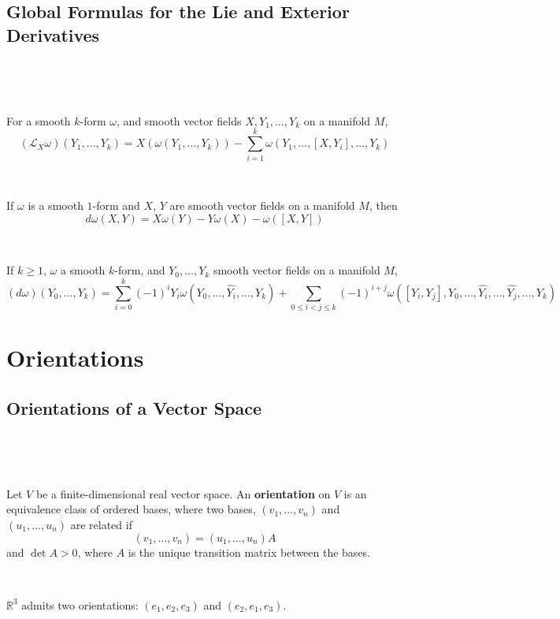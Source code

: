 \documentclass{article}
\begin{document}
\subsection{Global Formulas for the Lie and Exterior Derivatives}
\

\begin{theorem}
  \

  For a smooth $k$-form $\omega$, and smooth vector fields $X, Y_1, \dots, Y_k$ on a manifold $M$, $$(\mathcal{L}_X\omega)(Y_1,\dots,Y_k) = X(\omega(Y_1,\dots,Y_k)) - \sum_{i=1}^k\omega(Y_1, \dots, [X, Y_i], \dots, Y_k)$$
\end{theorem}

\begin{proposition}
  \

  If $\omega$ is a smooth $1$-form and $X$, $Y$ are smooth vector fields on a manifold $M$, then $$d\omega(X,Y) = X\omega(Y) - Y\omega(X) - \omega([X,Y])$$
\end{proposition}

\begin{theorem}
  \

  If $k\geq 1$, $\omega$ a smooth $k$-form, and $Y_0,\dots, Y_k$ smooth vector fields on a manifold $M$, $$(d\omega)(Y_0, \dots, Y_k) = \sum_{i=0}^k(-1)^iY_i\omega(Y_0, \dots, \hat{Y_i}, \dots, Y_k) + \sum_{0 \leq i < j \leq k} (-1)^{i+j} \omega([Y_i, Y_j], Y_0, \dots, \hat{Y_i}, \dots, \hat{Y_j}, \dots, Y_k)$$
\end{theorem}

\section{Orientations}

\subsection{Orientations of a Vector Space}
\

\begin{definition}[Orientations]
  \

  Let $V$ be a finite-dimensional real vector space. An \textbf{orientation} on $V$ is an equivalence class of ordered bases, where two bases, $(v_1, \dots, v_n)$ and $(u_1, \dots, u_n)$ are related if $$(v_1, \dots, v_n) = (u_1,\dots, u_n)A$$and $\det A > 0$, where $A$ is the unique transition matrix between the bases.
\end{definition}

\begin{example}
  \

  $\mathbb{R}^3$ admits two orientations: $(e_1,e_2,e_3)$ and $(e_2,e_1,e_3)$.
\end{example}
\end{document}
